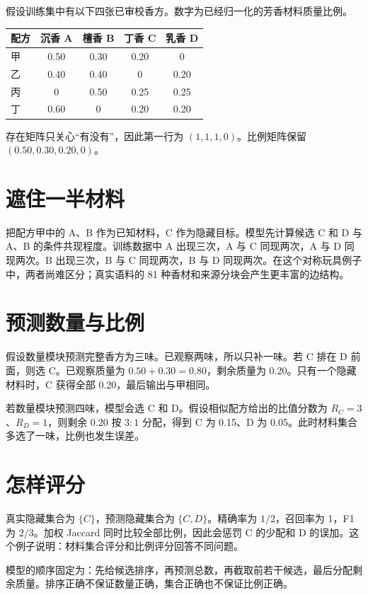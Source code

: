 \documentclass[UTF8,11pt,openany,fontset=none]{ctexbook}
\newenvironment{keybox}{\begin{leftbar}\small\noindent}{\end{leftbar}}
\begin{document}
假设训练集中有以下四张已审校香方。数字为已经归一化的芳香材料质量比例。

\begin{center}
\begin{tabular}{lcccc}
\toprule
配方 & 沉香 A & 檀香 B & 丁香 C & 乳香 D\\
\midrule
甲 & 0.50 & 0.30 & 0.20 & 0\\
乙 & 0.40 & 0.40 & 0 & 0.20\\
丙 & 0 & 0.50 & 0.25 & 0.25\\
丁 & 0.60 & 0 & 0.20 & 0.20\\
\bottomrule
\end{tabular}
\end{center}

存在矩阵只关心“有没有”，因此第一行为 $(1,1,1,0)$。比例矩阵保留 $(0.50,0.30,0.20,0)$。

\section{遮住一半材料}

把配方甲中的 A、B 作为已知材料，C 作为隐藏目标。模型先计算候选 C 和 D 与 A、B 的条件共现程度。训练数据中 A 出现三次，A 与 C 同现两次，A 与 D 同现两次。B 出现三次，B 与 C 同现两次，B 与 D 同现两次。在这个对称玩具例子中，两者尚难区分；真实语料的 81 种香材和来源分块会产生更丰富的边结构。

\section{预测数量与比例}

假设数量模块预测完整香方为三味。已观察两味，所以只补一味。若 C 排在 D 前面，则选 C。已观察质量为 $0.50+0.30=0.80$，剩余质量为 0.20。只有一个隐藏材料时，C 获得全部 0.20，最后输出与甲相同。

若数量模块预测四味，模型会选 C 和 D。假设相似配方给出的比值分数为 $R_C=3$、$R_D=1$，则剩余 0.20 按 $3:1$ 分配，得到 C 为 0.15、D 为 0.05。此时材料集合多选了一味，比例也发生误差。

\section{怎样评分}

真实隐藏集合为 $\{C\}$，预测隐藏集合为 $\{C,D\}$。精确率为 $1/2$，召回率为 1，F1 为 $2/3$。加权 Jaccard 同时比较全部比例，因此会惩罚 C 的少配和 D 的误加。这个例子说明：材料集合评分和比例评分回答不同问题。

\begin{keybox}
模型的顺序固定为：先给候选排序，再预测总数，再截取前若干候选，最后分配剩余质量。排序正确不保证数量正确，集合正确也不保证比例正确。
\end{keybox}
\end{document}

